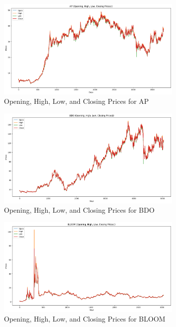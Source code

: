 \begin{figure}[ht]
    \centering
    \includegraphics[width=0.80\textwidth]{./assets/Appendices/B/OHLC_Prices/AP.png}
    \caption{Opening, High, Low, and Closing Prices for AP}
    \label{fig:ohlc_AP}
\end{figure}
\FloatBarrier

\begin{figure}[ht]
    \centering
    \includegraphics[width=0.80\textwidth]{./assets/Appendices/B/OHLC_Prices/BDO.png}
    \caption{Opening, High, Low, and Closing Prices for BDO}
    \label{fig:ohlc_BDO}
\end{figure}
\FloatBarrier

\begin{figure}[ht]
    \centering
    \includegraphics[width=0.80\textwidth]{./assets/Appendices/B/OHLC_Prices/BLOOM.png}
    \caption{Opening, High, Low, and Closing Prices for BLOOM}
    \label{fig:ohlc_BLOOM}
\end{figure}
\FloatBarrier

